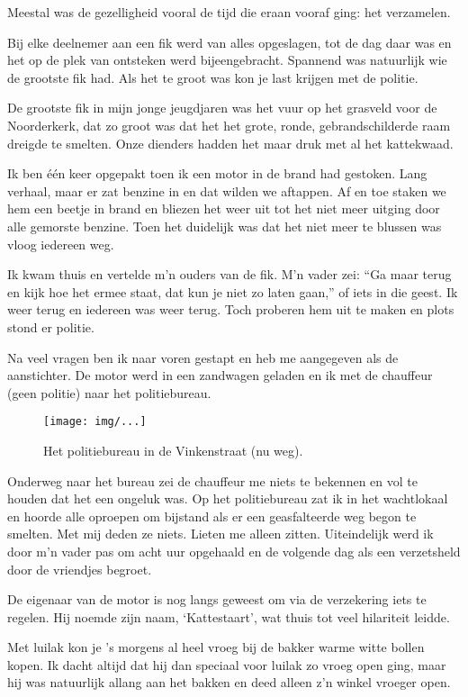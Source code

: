 \documentclass[10pt,twoside,openright]{memoir}
\begin{document}
Meestal was de gezelligheid vooral de tijd die eraan vooraf ging: het verzamelen. 

Bij elke deelnemer aan een fik werd van alles opgeslagen, tot de dag daar was en het op de plek van ontsteken werd bijeengebracht. Spannend was natuurlijk wie de grootste fik had. Als het te groot was kon je last krijgen met de politie.

De grootste fik in mijn jonge jeugdjaren was het vuur op het grasveld voor de Noorderkerk, dat zo groot was dat het het grote, ronde, gebrandschilderde raam dreigde te smelten. Onze dienders hadden het maar druk met al het kattekwaad. 

Ik ben één keer opgepakt toen ik een motor in de brand had gestoken. Lang verhaal, maar er zat benzine in en dat wilden we aftappen. Af en toe staken we hem een beetje in brand en bliezen het weer uit tot het niet meer uitging door alle gemorste benzine. Toen het duidelijk was dat het niet meer te blussen was vloog iedereen weg. 

Ik kwam thuis en vertelde m’n ouders van de fik. M’n vader zei: ``Ga maar terug en kijk hoe het ermee staat, dat kun je niet zo laten gaan,'' of iets in die geest. Ik weer terug en iedereen was weer terug. Toch proberen hem uit te maken en plots stond er politie. 

Na veel vragen ben ik naar voren gestapt en heb me aangegeven als de aanstichter. De motor werd in een zandwagen geladen en ik met de chauffeur (geen politie) naar het politiebureau. 

\begin{figure}[t]
\texttt{[image: img/...]}
\caption{Het politiebureau in de Vinkenstraat (nu weg).}
\end{figure}

Onderweg naar het bureau zei de chauffeur me niets te bekennen en vol te houden dat het een ongeluk was. Op het politiebureau zat ik in het wachtlokaal en hoorde alle oproepen om bijstand als er een geasfalteerde weg begon te smelten. Met mij deden ze niets. Lieten me alleen zitten. Uiteindelijk werd ik door m’n vader pas om acht uur opgehaald en de volgende dag als een verzetsheld door de vriendjes begroet. 

De eigenaar van de motor is nog langs geweest om via de verzekering iets te regelen. Hij noemde zijn naam, `Kattestaart', wat thuis tot veel hilariteit leidde.

Met luilak kon je ’s morgens al heel vroeg bij de bakker warme witte bollen kopen. Ik dacht altijd dat hij dan speciaal voor luilak zo vroeg open ging, maar hij was natuurlijk allang aan het bakken en deed alleen z’n winkel vroeger open. 
\end{document}
